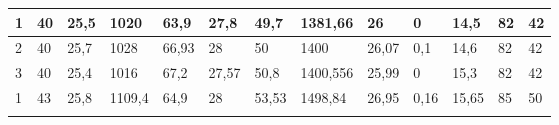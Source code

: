 \begin{table}[H]
{\begin{tabular}{|l|llll|lll|ll|l|ll|}
\rowcolor[HTML]{C6E0B4} 
1             & \multicolumn{1}{l|}{\cellcolor[HTML]{C6E0B4}40}               & \multicolumn{1}{l|}{\cellcolor[HTML]{C6E0B4}25,5}             & \multicolumn{1}{l|}{\cellcolor[HTML]{C6E0B4}1020}             & 63,9              & \multicolumn{1}{l|}{\cellcolor[HTML]{C6E0B4}27,8}              & \multicolumn{1}{l|}{\cellcolor[HTML]{C6E0B4}49,7}              & 1381,66           & \multicolumn{1}{l|}{\cellcolor[HTML]{C6E0B4}26}               & 0                & 14,5                      & \multicolumn{1}{l|}{\cellcolor[HTML]{C6E0B4}82}                  & 42               \\ \hline
\rowcolor[HTML]{E2EFDA} 
2             & \multicolumn{1}{l|}{\cellcolor[HTML]{E2EFDA}40}               & \multicolumn{1}{l|}{\cellcolor[HTML]{E2EFDA}25,7}             & \multicolumn{1}{l|}{\cellcolor[HTML]{E2EFDA}1028}             & 66,93             & \multicolumn{1}{l|}{\cellcolor[HTML]{E2EFDA}28}                & \multicolumn{1}{l|}{\cellcolor[HTML]{E2EFDA}50}                & 1400              & \multicolumn{1}{l|}{\cellcolor[HTML]{E2EFDA}26,07}            & 0,1              & 14,6                      & \multicolumn{1}{l|}{\cellcolor[HTML]{E2EFDA}82}                  & 42               \\ \hline
\rowcolor[HTML]{C6E0B4} 
3             & \multicolumn{1}{l|}{\cellcolor[HTML]{C6E0B4}40}               & \multicolumn{1}{l|}{\cellcolor[HTML]{C6E0B4}25,4}             & \multicolumn{1}{l|}{\cellcolor[HTML]{C6E0B4}1016}             & 67,2              & \multicolumn{1}{l|}{\cellcolor[HTML]{C6E0B4}27,57}             & \multicolumn{1}{l|}{\cellcolor[HTML]{C6E0B4}50,8}              & 1400,556          & \multicolumn{1}{l|}{\cellcolor[HTML]{C6E0B4}25,99}            & 0                & 15,3                      & \multicolumn{1}{l|}{\cellcolor[HTML]{C6E0B4}82}                  & 42               \\ \hline
\rowcolor[HTML]{E2EFDA} 
1             & \multicolumn{1}{l|}{\cellcolor[HTML]{E2EFDA}43}               & \multicolumn{1}{l|}{\cellcolor[HTML]{E2EFDA}25,8}             & \multicolumn{1}{l|}{\cellcolor[HTML]{E2EFDA}1109,4}           & 64,9              & \multicolumn{1}{l|}{\cellcolor[HTML]{E2EFDA}28}                & \multicolumn{1}{l|}{\cellcolor[HTML]{E2EFDA}53,53}             & 1498,84           & \multicolumn{1}{l|}{\cellcolor[HTML]{E2EFDA}26,95}            & 0,16             & 15,65                     & \multicolumn{1}{l|}{\cellcolor[HTML]{E2EFDA}85}                  & 50               \\ \hline
\rowcolor[HTML]{C6E0B4} 

\end{tabular}}
\end{table}
